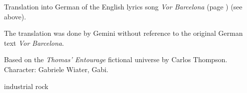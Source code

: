 
\label{sec:vor-barcelona-deutsch}

\begin{notes}
Translation into German of the English lyrics song \emph{Vor Barcelona} (page \pageref{sec:vor-barcelona}) (see above).

The translation was done by Gemini without reference to the original German text \emph{Vor Barcelona}.

Based on the \emph{Thomas’ Entourage} fictional universe by Carlos Thompson.\\
Character: Gabriele Wiater, Gabi.
\end{notes}

\begin{style}
industrial rock
\end{style}

